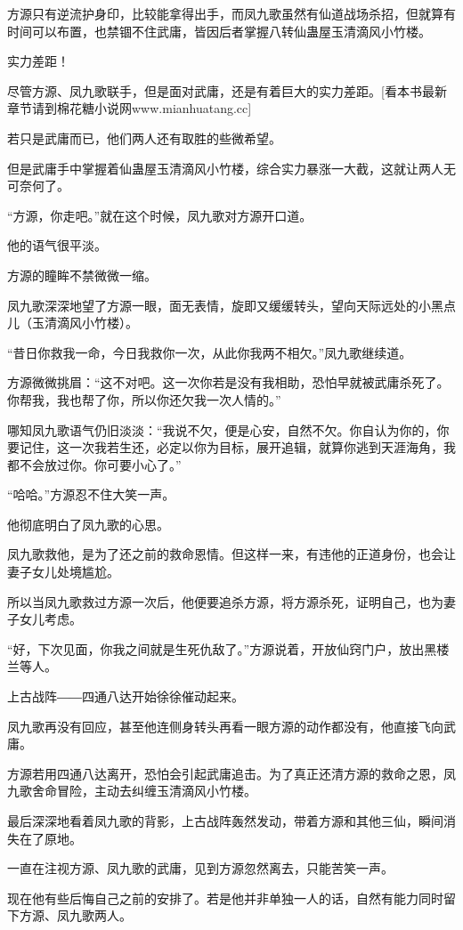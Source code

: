 \begin{this_body}
方源只有逆流护身印，比较能拿得出手，而凤九歌虽然有仙道战场杀招，但就算有时间可以布置，也禁锢不住武庸，皆因后者掌握八转仙蛊屋玉清滴风小竹楼。

实力差距！

尽管方源、凤九歌联手，但是面对武庸，还是有着巨大的实力差距。[看本书最新章节请到棉花糖小说网www.mianhuatang.cc]

若只是武庸而已，他们两人还有取胜的些微希望。

但是武庸手中掌握着仙蛊屋玉清滴风小竹楼，综合实力暴涨一大截，这就让两人无可奈何了。

“方源，你走吧。”就在这个时候，凤九歌对方源开口道。

他的语气很平淡。

方源的瞳眸不禁微微一缩。

凤九歌深深地望了方源一眼，面无表情，旋即又缓缓转头，望向天际远处的小黑点儿（玉清滴风小竹楼）。

“昔日你救我一命，今日我救你一次，从此你我两不相欠。”凤九歌继续道。

方源微微挑眉：“这不对吧。这一次你若是没有我相助，恐怕早就被武庸杀死了。你帮我，我也帮了你，所以你还欠我一次人情的。”

哪知凤九歌语气仍旧淡淡：“我说不欠，便是心安，自然不欠。你自认为你的，你要记住，这一次我若生还，必定以你为目标，展开追辑，就算你逃到天涯海角，我都不会放过你。你可要小心了。”

“哈哈。”方源忍不住大笑一声。

他彻底明白了凤九歌的心思。

凤九歌救他，是为了还之前的救命恩情。但这样一来，有违他的正道身份，也会让妻子女儿处境尴尬。

所以当凤九歌救过方源一次后，他便要追杀方源，将方源杀死，证明自己，也为妻子女儿考虑。

“好，下次见面，你我之间就是生死仇敌了。”方源说着，开放仙窍门户，放出黑楼兰等人。

上古战阵――四通八达开始徐徐催动起来。

凤九歌再没有回应，甚至他连侧身转头再看一眼方源的动作都没有，他直接飞向武庸。

方源若用四通八达离开，恐怕会引起武庸追击。为了真正还清方源的救命之恩，凤九歌舍命冒险，主动去纠缠玉清滴风小竹楼。

最后深深地看着凤九歌的背影，上古战阵轰然发动，带着方源和其他三仙，瞬间消失在了原地。

一直在注视方源、凤九歌的武庸，见到方源忽然离去，只能苦笑一声。

现在他有些后悔自己之前的安排了。若是他并非单独一人的话，自然有能力同时留下方源、凤九歌两人。


\end{this_body}
